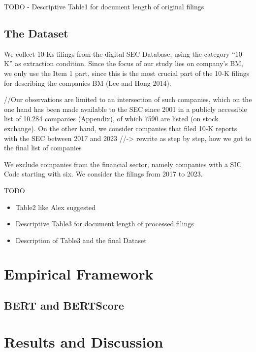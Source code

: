 \documentclass[
]{article}
\providecommand{\tightlist}{%
  \setlength{\itemsep}{0pt}\setlength{\parskip}{0pt}}\usepackage{longtable,booktabs,array}
\begin{document}
TODO - Descriptive Table1 for document length of original filings

\subsection{The Dataset}\label{the-dataset}

We collect 10-Ks filings from the digital SEC Database, using the
category ``10-K'' as extraction condition. Since the focus of our study
lies on company's BM, we only use the Item 1 part, since this is the
most crucial part of the 10-K filings for describing the companies BM
(Lee and Hong 2014).

//Our observations are limited to an intersection of such companies,
which on the one hand has been made available to the SEC since 2001 in a
publicly accessible list of 10.284 companies (Appendix), of which 7590
are listed (on stock exchange). On the other hand, we consider companies
that filed 10-K reports with the SEC between 2017 and 2023
//-\textgreater{} rewrite as step by step, how we got to the final list
of companies

We exclude companies from the financial sector, namely companies with a
SIC Code starting with six. We consider the filings from 2017 to 2023.

TODO

\begin{itemize}
\tightlist
\item
  Table2 like Alex suggested
\item
  Descriptive Table3 for document length of processed filings
\item
  Description of Table3 and the final Dataset
\end{itemize}

\section{Empirical Framework}\label{empirical-framework}

\subsection{BERT and BERTScore}\label{bert-and-bertscore}

\section{Results and Discussion}\label{results-and-discussion}
\end{document}
